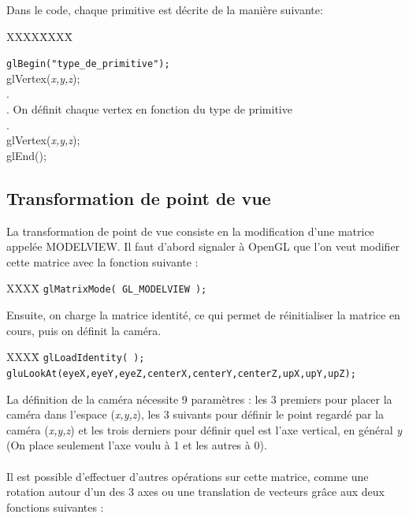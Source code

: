 Dans le code, chaque primitive est décrite de la manière suivante:


\begin{tabbing}
XXXX\=XXXX\= \kill

\> \verb|glBegin("type_de_primitive");| \\
\> \> glVertex(\textit{x,y,z});\\
\> \> . \\
\> \> . On définit chaque vertex en fonction du type de primitive\\
\> \> . \\
\> \> glVertex(\textit{x,y,z});\\
\> glEnd();
\end{tabbing}

\subsection{Transformation de point de vue}
La transformation de point de vue consiste en la modification d'une matrice appelée MODELVIEW. Il faut d'abord signaler à OpenGL que l'on veut modifier cette matrice avec la fonction suivante :

\begin{tabbing}
XXXX\= \kill
\> \verb|glMatrixMode( GL_MODELVIEW );|
\end{tabbing}

Ensuite, on charge la matrice identité, ce qui permet de réinitialiser la matrice en cours, puis on définit la caméra.

\begin{tabbing}
XXXX\= \kill
\> \verb|glLoadIdentity( );| \\
\> \verb|gluLookAt(eyeX,eyeY,eyeZ,centerX,centerY,centerZ,upX,upY,upZ);|
\end{tabbing}

La définition de la caméra nécessite 9 paramètres : les 3 premiers pour placer la caméra dans l'espace (\textit{x,y,z}), les 3 suivants pour définir le point regardé par la caméra (\textit{x,y,z}) et les trois derniers pour définir quel est l'axe vertical, en général \textit{y} (On place seulement l'axe voulu à 1 et les autres à 0).\\\\

Il est possible d'effectuer d'autres opérations sur cette matrice, comme une rotation autour d'un des 3 axes ou une translation de vecteurs grâce aux deux fonctions suivantes :

